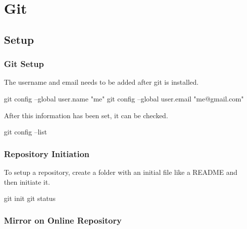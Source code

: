 \documentclass[]{book}
\newenvironment{Shaded}{\begin{snugshade}}{\end{snugshade}}
\newcommand{\FunctionTok}[1]{\textcolor[rgb]{0.00,0.00,0.00}{#1}}
\newcommand{\NormalTok}[1]{#1}
\newcommand{\StringTok}[1]{\textcolor[rgb]{0.31,0.60,0.02}{#1}}
\begin{document}
\hypertarget{git}{%
\chapter{Git}\label{git}}

\hypertarget{setup}{%
\section{Setup}\label{setup}}

\hypertarget{git-setup}{%
\subsection{Git Setup}\label{git-setup}}

The username and email needs to be added after git is installed.

\begin{Shaded}
\begin{Highlighting}[]
\FunctionTok{git}\NormalTok{ config --global user.name }\StringTok{"me"}
\FunctionTok{git}\NormalTok{ config --global user.email }\StringTok{"me@gmail.com"}
\end{Highlighting}
\end{Shaded}

After this information has been set, it can be checked.

\begin{Shaded}
\begin{Highlighting}[]
\FunctionTok{git}\NormalTok{ config --list}
\end{Highlighting}
\end{Shaded}

\hypertarget{repository-initiation}{%
\subsection{Repository Initiation}\label{repository-initiation}}

To setup a repository, create a folder with an initial file like a README and then initiate it.

\begin{Shaded}
\begin{Highlighting}[]
\FunctionTok{git}\NormalTok{ init}
\FunctionTok{git}\NormalTok{ status}
\end{Highlighting}
\end{Shaded}

\hypertarget{mirror-on-online-repository}{%
\subsection{Mirror on Online Repository}\label{mirror-on-online-repository}}
\end{document}
